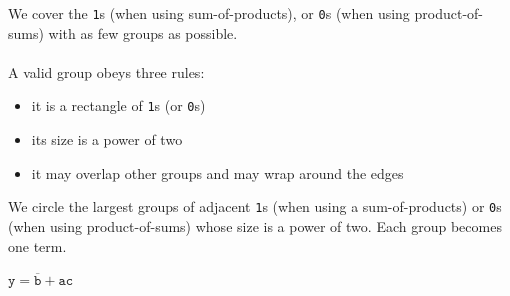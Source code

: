 \documentclass[mathserif, handout]{beamer}
\newcommand{\ttab}[1]{\texttt{#1}}
\begin{document}
\begin{frame}
  We cover the \ttab{1}s (when using sum-of-products), or \ttab{0}s (when using product-of-sums) with as few groups as possible.
  \\~\\
  A valid group obeys three rules:\\[3mm]
  \begin{itemize}
    \item it is a rectangle of \ttab{1}s (or \ttab{0}s) \\[1.5mm]
    \item its size is a power of two \\[1.5mm]
    \item it may overlap other groups and may wrap around the edges
  \end{itemize}
\end{frame}


\begin{frame}
  We circle the largest groups of adjacent \ttab{1}s (when using a sum-of-products) or \ttab{0}s (when using product-of-sums) whose size is a power of two. Each group becomes one term.\\[2mm]
  \begin{figure}
  \hspace{-0.7cm}
  \end{figure}
  \begin{center}
    $\ttab{y} = \overline{\ttab{b}} + \ttab{a}\ttab{c}$
  \end{center}
\end{frame}
\end{document}
